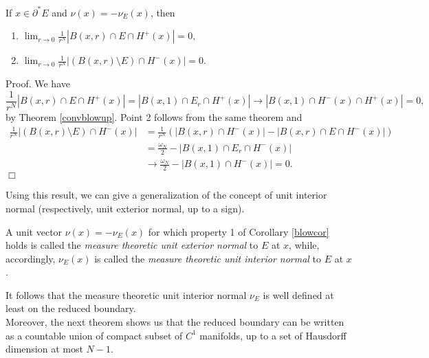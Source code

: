 \begin{corollary} \label{blowcor} If $x \in \partial^{*}E$ and $\nu(x) = - \nu_{E}(x)$, then
\begin{enumerate}
	\item $\displaystyle \lim_{r \to 0} \frac{1}{r^{N}} |B(x,r) \cap E \cap H^{+}(x)| = 0,$
	\item $\displaystyle \lim_{r \to 0} \frac{1}{r^{N}} |(B(x,r) \setminus E) \cap H^{-}(x)| = 0.$
\end{enumerate}
\end{corollary}
Proof. We have 
\[\frac{1}{r^{N}} |B(x,r) \cap E \cap H^{+}(x)| = |B(x,1) \cap E_{r} \cap H^{+}(x)| \to |B(x,1) \cap H^{-}(x) \cap H^{+}(x)| = 0,\]
by Theorem \ref{convblowup}. Point 2 follows from the same theorem and 
\begin{align*} \frac{1}{r^{N}} |(B(x,r) \setminus E) \cap H^{-}(x)| & = \frac{1}{r^{N}} ( |B(x,r) \cap H^{-}(x)| - |B(x,r) \cap E \cap H^{-}(x)|) \\
& = \frac{\omega_{N}}{2} - |B(x,1) \cap E_{r} \cap H^{-}(x)| \\
& \to \frac{\omega_{N}}{2} - |B(x,1) \cap H^{-}(x)| = 0. \end{align*}
\hfill $\Box$

Using this result, we can give a generalization of the concept of unit interior normal (respectively, unit exterior normal, up to a sign).

\begin{definition} A unit vector $\nu(x) = - \nu_{E}(x)$ for which property 1 of Corollary \ref{blowcor} holds is called the {\em measure theoretic unit exterior normal} to $E$ at $x$, while, accordingly, $\nu_{E}(x)$ is called the {\em measure theoretic unit interior normal} to $E$ at $x$.
\end{definition}

It follows that the measure theoretic unit interior normal $\nu_{E}$ is well defined at least on the reduced boundary. 
\\
Moreover, the next theorem shows us that the reduced boundary can be written as a countable union of compact subset of $C^{1}$ manifolds, up to a set of Hausdorff dimension at most $N-1$. 

